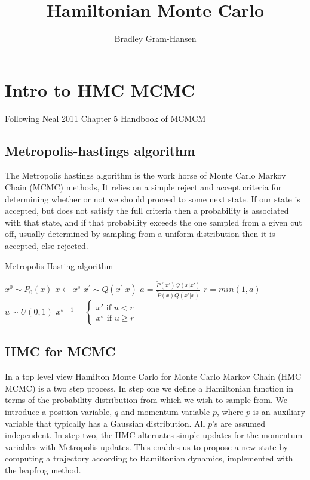 \documentclass[]{report}
\title{Hamiltonian Monte Carlo}
\author{Bradley Gram-Hansen}
\begin{document}
\maketitle


\section{Intro to HMC MCMC}

Following Neal 2011 Chapter 5 Handbook of MCMCM
\subsection{Metropolis-hastings algorithm}
The Metropolis hastings algorithm is the work horse of Monte Carlo Markov Chain (MCMC) methods, It relies on a simple reject and accept criteria for determining whether or not we should proceed to some next state. If our state is accepted, but does not satisfy the full criteria then a probability is associated with that state, and if that probability exceeds the one sampled from a given cut off, usually determined by sampling from a uniform distribution then it is accepted, else rejected. 

\begin{algorithm}
\caption{Metropolis-Hasting algorithm}
\begin{algorithmic}[1]
	\State  $x^{0} \sim P_{0}(x)$ 
		\State $ x \gets x^{s} $
		\State $ x^{'} \sim Q(x^{'}|x)$
		\State $a = \frac{\tilde{P}(x')Q(x|x')}{\tilde{P}(x)Q(x'|x)}$ 
		\State $r = min(1, a) $ 
		\State $u \sim  U(0,1)$ 
		\State $x^{s+1} = \begin{cases}
		x' \text{ if $u < r$}\\
		x^{s} \text{ if $u \geq r$}
		\end{cases}$
		\EndFor
\end{algorithmic} 
\end{algorithm}

\subsection{HMC for MCMC}

In a top level view Hamilton Monte Carlo for Monte Carlo Markov Chain (HMC MCMC) is a two step process. In step one we define a Hamiltonian function in terms of the probability distribution from which we wish to sample from. We introduce a position variable, $q$ and momentum variable $p$, where $p$ is an auxiliary variable that typically has a Gaussian distribution.  All $p$'s are assumed independent. 
In step two, the HMC alternates simple updates for the momentum variables with Metropolis updates. This enables us to propose a new state by computing a trajectory according to Hamiltonian dynamics, implemented with the leapfrog method. 
\end{document}
